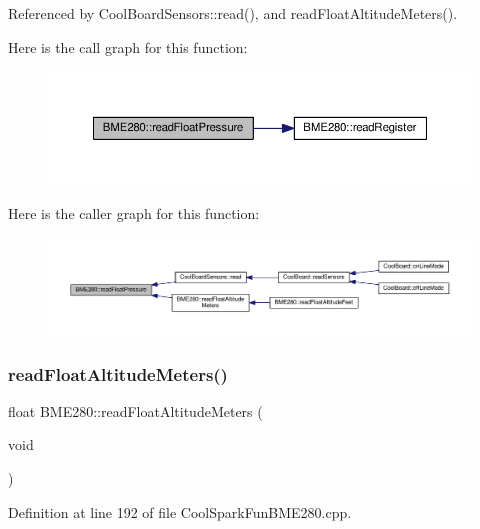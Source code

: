 Referenced by Cool\+Board\+Sensors\+::read(), and read\+Float\+Altitude\+Meters().

Here is the call graph for this function\+:
\nopagebreak
\begin{figure}[H]
\begin{center}
\leavevmode
\includegraphics[width=350pt]{df/dcf/class_b_m_e280_ada6e799917afb4f228e6253bc56ffe75_cgraph}
\end{center}
\end{figure}
Here is the caller graph for this function\+:
\nopagebreak
\begin{figure}[H]
\begin{center}
\leavevmode
\includegraphics[width=350pt]{df/dcf/class_b_m_e280_ada6e799917afb4f228e6253bc56ffe75_icgraph}
\end{center}
\end{figure}
\mbox{\label{class_b_m_e280_af67b56ba50760ee1d116acc6c5010221}} 
\subsubsection{\texorpdfstring{read\+Float\+Altitude\+Meters()}{readFloatAltitudeMeters()}}
{\footnotesize\ttfamily float B\+M\+E280\+::read\+Float\+Altitude\+Meters (\begin{DoxyParamCaption}\item[{void}]{ }\end{DoxyParamCaption})}



Definition at line 192 of file Cool\+Spark\+Fun\+B\+M\+E280.\+cpp.




